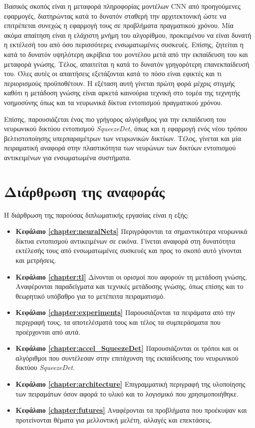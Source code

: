 Βασικός σκοπός είναι η μεταφορά πληροφορίας μοντέλων CNN από προηγούμενες εφαρμογές, διατηρώντας κατά το δυνατόν σταθερή την αρχιτεκτονική ώστε να επιτρέπεται συνεχώς η εφαρμογή τους σε προβλήματα πραγματικού χρόνου. Μία ακόμα απαίτηση είναι η ελάχιστη μνήμη του αλγορίθμου, προκειμένου να είναι δυνατή η εκτέλεσή του από όσο περισσότερες ενσωματωμένες συσκευές. Επίσης, ζητείται η κατά το δυνατόν υψηλότερη ακρίβεια του μοντέλου μετά από την εκπαίδευση του και μεταφορά γνώσης. Τέλος, απαιτείται η κατά το δυνατόν γρηγορότερη επανεκπαίδευσή του. Όλες αυτές οι απαιτήσεις εξετάζονται κατά το πόσο είναι εφικτές και τι περιορισμούς προϋποθέτουν. Η εξέταση αυτή γίνεται πρώτη φορά μέχρις στιγμής καθότι η μετάδοση γνώσης είναι αρκετά καινούρια τεχνική στο τομέα της τεχνητής νοημοσύνης όπως και τα νευρωνικά δίκτυα εντοπισμού πραγματικού χρόνου.

Επίσης, παρουσιάζεται ένας πιο γρήγορος αλγόριθμος για την εκπαίδευση του νευρωνικού δικτύου εντοπισμού \textit{SqueezeDet}, όπως και η εφαρμογή ενός νέου τρόπου βελτιστοποίησης υπερπαραμέτρων των νευρωνικών δικτύων. Τέλος, γίνεται και μία πειραματική αναφορά στην πλαστικότητα των νευρώνων των δικτύων εντοπισμού αντικειμένων για ενσωματωμένα συστήματα.

\section{Διάρθρωση της αναφοράς}
Η διάρθρωση της παρούσας διπλωματικής εργασίας είναι η εξής:

\begin{itemize}
    \item \textbf{Κεφάλαιο \ref{chapter:neuralNets}} Περιγράφονται τα σημαντικότερα νευρωνικά δίκτυα εντοπισμού αντικειμένων σε εικόνα. Γίνεται αναφορά στη δυνατότητα εκτέλεσής τους από ενσωματωμένες συσκευές και προς το σκοπό αυτό γίνονται και μετρήσεις.
    \item \textbf{Κεφάλαιο \ref{chapter:tl}} Δίνονται οι ορισμοί που αφορούν τη μετάδοση γνώσης. Αναφέρονται παραδείγματα και τεχνικές μετάδοσης γνώσης, όπως επίσης και το θεωρητικό υπόβαθρο για το μετέπειτα πειραματισμό. 
    \item \textbf{Κεφάλαιο \ref{chapter:experiments}} Παρουσιάζονται τα πειράματα από την περιγραφή τους, τα αποτελέσματά τους και τέλος τα συμπεράσματα που προέρχονται από αυτά.
    \item \textbf{Κεφάλαιο \ref{chapter:accel_SqueezeDet}} Παρουσιάζονται οι τρόποι και οι αλγόριθμοι που συντέλεσαν στην επιτάχυνση της εκπαίδευσης του νευρωνικού δικτύου \textit{SqueezeDet}.    
    \item \textbf{Κεφάλαιο \ref{chapter:architecture}} Επιγραμματική περιγραφή της υλοποίησης των πειραμάτων όσον αφορά το υλικό και το λογισμικό που χρησιμοποιήθηκε.
    \item \textbf{Κεφάλαιο \ref{chapter:futures}} Αναφέρονται τα προβλήματα που προέκυψαν και προτείνονται
    θέματα για μελλοντική μελέτη, αλλαγές και επεκτάσεις.
\end{itemize}